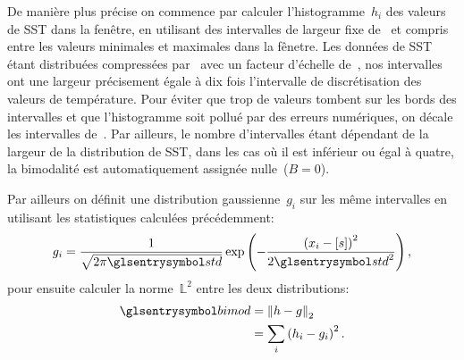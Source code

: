 De manière plus précise on commence par calculer l'histogramme~\(h_i\) des valeurs de SST dans la fenêtre, en utilisant des intervalles de largeur fixe de~ et compris entre les valeurs minimales et maximales dans la fênetre.
Les données de SST étant distribuées compressées par \footnotemark\ avec un facteur d'échelle de~, nos intervalles ont une largeur précisement égale à dix fois l'intervalle de discrétisation des valeurs de température.
Pour éviter que trop de valeurs tombent sur les bords des intervalles et que l'histogramme soit pollué par des erreurs numériques, on décale les intervalles de~.
Par ailleurs, le nombre d'intervalles étant dépendant de la largeur de la distribution de SST, dans les cas où il est inférieur ou égal à quatre, la bimodalité est automatiquement assignée nulle~(\(B=0\)).

Par ailleurs on définit une distribution gaussienne~\(g_i\) sur les même intervalles en utilisant les statistiques calculées précédemment:
\begin{equation}
  g_i = \frac{1}{\sqrt{2\pi\am{std}}} \exp\paren{-\frac{\paren{x_i-\moy{s}}^2}{2\am{std}^2}},
\end{equation}
pour ensuite calculer la norme~\(\mathbb{L}^2\) entre les deux distributions:
\begin{equation}
  \begin{split}
  \am{bimod} & = \norme[2]{h - g}\\
             & = \sum_i \paren{h_i - g_i}^2 .
  \end{split}
\end{equation}

